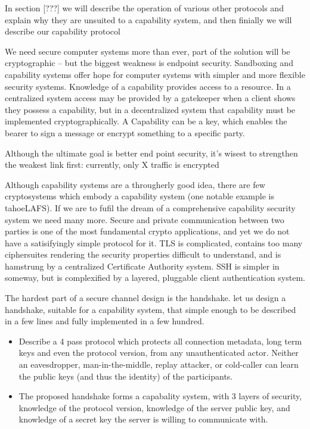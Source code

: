 \documentclass[12pt]{article}
\begin{document}
In section [???] we will describe the operation of various other
protocols and explain why they are unsuited to a capability system,
and then finially we will describe our capability protocol

We need secure computer systems more than ever, part of the solution
will be cryptographic -- but the biggest weakness is endpoint security.
Sandboxing and capability systems\cite{unicap} offer hope for computer systems
with simpler and more flexible security systems. Knowledge of a capability
provides access to a resource. In a centralized system access may be
provided by a gatekeeper when a client shows they possess a capability,
but in a decentralized system that capability must be implemented
cryptographically. A Capability can be a key, which enables the bearer
to sign a message or encrypt something to a specific party.

Although the ultimate goal is better end point security, it's wisest
to strengthen the weakest link first: currently, only X%
traffic is encrypted \cite{???}

Although capability systems are a througherly good idea, there are
few cryptosystems which embody a capability system (one notable example
is tahoeLAFS\cite{tahoe}). If we are to fufil the dream of a comprehensive
capability security system we need many more. Secure and private
communication between two parties is one of the most fundamental
crypto applications, and yet we do not have a satisifyingly simple
protocol for it. TLS is complicated, contains too many ciphersuites
rendering the security properties difficult to understand,
and is hamstrung by a centralized Certificate Authority system.
SSH is simpler in someway, but is complexified by a layered,
pluggable client authentication system.

The hardest part of a secure channel design is the handshake.
let us design a handshake, suitable for a capability system,
that simple enough to be described in a few lines and fully
implemented in a few hundred.

\begin{itemize}
\item Describe a 4 pass protocol which protects all connection metadata,
  long term keys and even the protocol version, from any
  unauthenticated actor. Neither an  eavesdropper, man-in-the-middle,
  replay attacker, or cold-caller can learn the public keys
  (and thus the identity) of the participants.

\item The proposed handshake forms a capabality system, with 3 layers
  of security, knowledge of the protocol version, knowledge of the server
  public key, and knowledge of a secret key the server is willing
  to communicate with.

\end{itemize}
\end{document}
